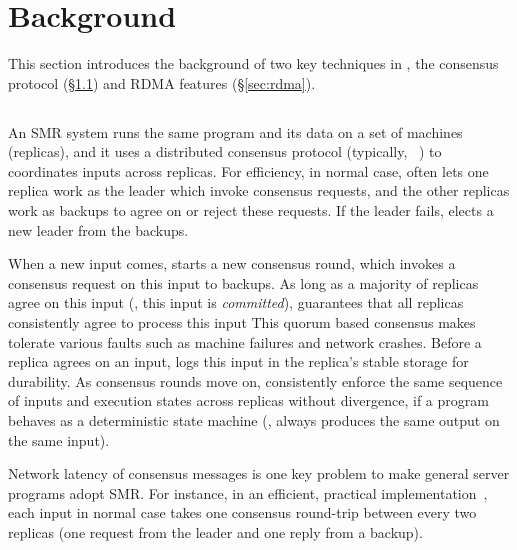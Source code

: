 \section{Background}\label{sec:background}

This section introduces the background of two key techniques in \xxx, the 
\paxos consensus protocol (\S\ref{sec:paxos}) and RDMA features 
(\S\ref{sec:rdma}).

\subsection{\paxos}\label{sec:paxos}
An SMR system runs the same program and its data on a set of machines 
(replicas), and it uses a distributed consensus protocol (typically, 
\paxos~\cite{paxos:complex,paxos,paxos:simple,paxos:live,paxos:fast,
paxos:practical}) to coordinates inputs across replicas. For efficiency, in 
normal case, \paxos often lets one replica work as the leader which invoke 
consensus requests, and the other replicas work as backups to agree on or reject 
these requests. If the leader fails, \paxos elects a new leader from the 
backups.

When a new input comes, \paxos starts a new consensus round, which invokes a 
consensus request on this input to backups. As long as a majority of replicas 
agree on this input (\ie, this input is \emph{committed}), \paxos guarantees 
that all replicas consistently agree to process this input  This quorum based 
consensus makes \paxos tolerate various faults such as machine failures and 
network crashes. Before a replica agrees on an input, \paxos logs this input in 
the replica's stable storage for durability. As consensus rounds move on, 
\paxos consistently enforce the same sequence of inputs and execution states 
across replicas without divergence, if a program behaves as a deterministic 
state machine (\ie, always produces the same output on the same input).

Network latency of consensus messages is one key problem to make general server 
programs adopt SMR. For instance, in an efficient, practical 
\paxos implementation~\cite{paxos:practical}, each input in normal case takes 
one consensus round-trip between every two replicas (one request from the leader 
and one reply from a backup).


